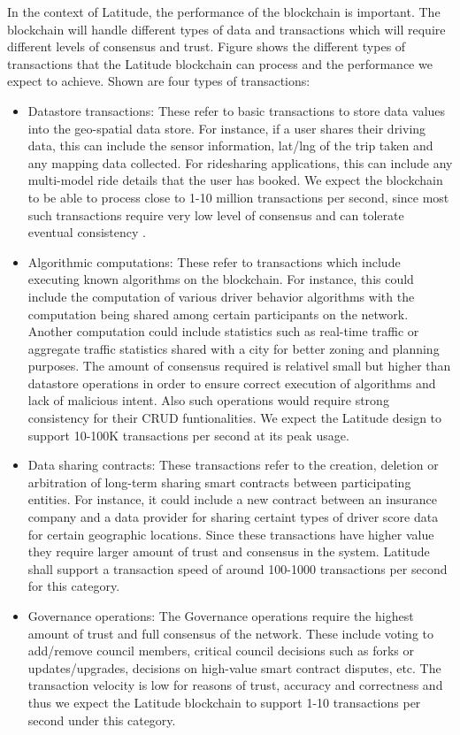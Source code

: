 In the context of Latitude, the performance of the blockchain is important. The blockchain will handle different types
of data and transactions which will require different levels of consensus and trust. Figure \cite{fig:tps_lat} shows the
different types of transactions that the Latitude blockchain can process and the performance we expect to achieve. Shown
are four types of transactions:
\begin{itemize}
    \item Datastore transactions: These refer to basic transactions to store data values into the geo-spatial data
        store. For instance, if a user shares their driving data, this can include the sensor information, lat/lng of
        the trip taken and any mapping data collected. For ridesharing applications, this can include any multi-model
        ride details that the user has booked. We expect the blockchain to be able to process close to 1-10 million
        transactions per second, since most such transactions require very low level of consensus and can tolerate 
        eventual consistency \cite{eventual_con}.
    \item Algorithmic computations: These refer to transactions which include executing known algorithms on the
        blockchain. For instance, this could include the computation of various driver behavior algorithms with the
        computation being shared among certain participants on the network. Another computation could include statistics
        such as real-time traffic or aggregate traffic statistics shared with a city for better zoning and planning
        purposes. The amount of consensus required is relativel small but higher than datastore operations in order to
        ensure correct execution of algorithms and lack of malicious intent. Also such operations would require strong
        consistency for their CRUD funtionalities. We expect the Latitude design to support 10-100K transactions per
        second at its peak usage.
    \item Data sharing contracts: These transactions refer to the creation, deletion or arbitration of long-term sharing
        smart contracts between participating entities. For instance, it could include a new contract between an
        insurance company and a data provider for sharing certaint types of driver score data for certain geographic
        locations. Since these transactions have higher value they require larger amount of trust and consensus in the
        system. Latitude shall support a transaction speed of around 100-1000 transactions per second for this category.
    \item Governance operations: The Governance operations require the highest amount of trust and full consensus of the
        network. These include voting to add/remove council members, critical council decisions such as forks or
        updates/upgrades, decisions on high-value smart contract disputes, etc. The transaction velocity is low for
        reasons of trust, accuracy and correctness and thus we expect the Latitude blockchain to support 1-10
        transactions per second under this category.

\end{itemize}

